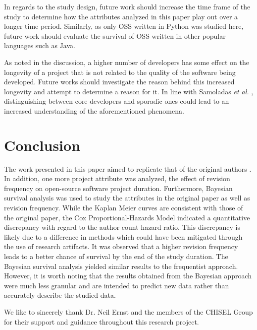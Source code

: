 \documentclass[sigconf]{acmart}
\begin{document}
In regards to the study design, future work should increase the time frame of the study to determine how the attributes analyzed in this paper play out over a longer time period. 
Similarly, as only OSS written in Python was studied here, future work should evaluate the survival of OSS written in other popular languages such as Java. 

As noted in the discussion, a higher number of developers has some effect on the longevity of a project that is not related to the quality of the software being developed. 
Future works should investigate the reason behind this increased longevity and attempt to determine a reason for it. 
In line with Samoladas \emph{et al.} \cite{samoladas2010survival}, distinguishing between core developers and sporadic ones could lead to an increased understanding of the aforementioned phenomena. 

\section{Conclusion} \label{conclusion}

The work presented in this paper aimed to replicate that of the original authors \cite{ali2020cheating}. 
In addition, one more project attribute was analyzed, the effect of revision frequency on open-source software project duration.
Furthermore, Bayesian survival analysis was used to study the attributes in the original paper as well as revision frequency.
While the Kaplan Meier curves are consistent with those of the original paper, the Cox Proportional-Hazards Model indicated a quantitative discrepancy with regard to the author count hazard ratio.
This discrepancy is likely due to a difference in methods which could have been mitigated through the use of research artifacts.
It was observed that a higher revision frequency leads to a better chance of survival by the end of the study duration. 
The Bayesian survival analysis yielded similar results to the frequentist approach.
However, it is worth noting that the results obtained from the Bayesian approach were much less granular and are intended to predict new data rather than accurately describe the studied data.

\begin{acks}
    We like to sincerely thank Dr. Neil Ernst and the members of the CHISEL Group for their support and guidance throughout this research project. 
\end{acks}
\balance


\end{document}
